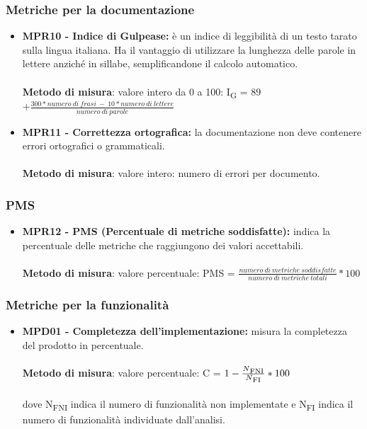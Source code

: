 \subsubsection{Metriche per la documentazione}
\begin{itemize}
    \item \textbf{MPR10 - Indice di Gulpease:}  è un indice di leggibilità di un testo tarato sulla lingua italiana. Ha il vantaggio di utilizzare la lunghezza delle parole in lettere anziché in sillabe, semplificandone il calcolo automatico.\\
    \\\textbf{Metodo di misura}: valore intero da 0 a 100: I\textsubscript{G} = 89 $+ \frac{300*numero \ di \ frasi \ - \ 10*numero \ di \ lettere}{numero \ di \ parole}$
    \item \textbf{MPR11 - Correttezza ortografica:}  la documentazione non deve contenere errori ortografici o grammaticali.\\
    \\\textbf{Metodo di misura}: valore intero: numero di errori per documento.
\end{itemize}

\subsubsection{PMS}
\begin{itemize}
    \item \textbf{MPR12 - PMS (Percentuale di metriche soddisfatte):} indica la percentuale delle metriche che raggiungono dei valori accettabili.\\
    \\\textbf{Metodo di misura}: valore percentuale: PMS = $\frac{numero \ di \ metriche \ soddisfatte}{numero \ di \ metriche \ totali} * 100$ 
\end{itemize}


\subsubsection{Metriche per la funzionalit\`a}
\begin{itemize}
    \item \textbf{MPD01 - Completezza dell'implementazione:} misura la completezza del prodotto in percentuale.\\
    \\\textbf{Metodo di misura}: valore percentuale: C = $1-\frac{N\textsubscript{FNI}}{N\textsubscript{FI}}*100$ \\
    \\dove N\textsubscript{FNI} indica il numero di funzionalità non implementate e N\textsubscript{FI} indica il numero di funzionalità 
    individuate dall'analisi.
\end{itemize}

